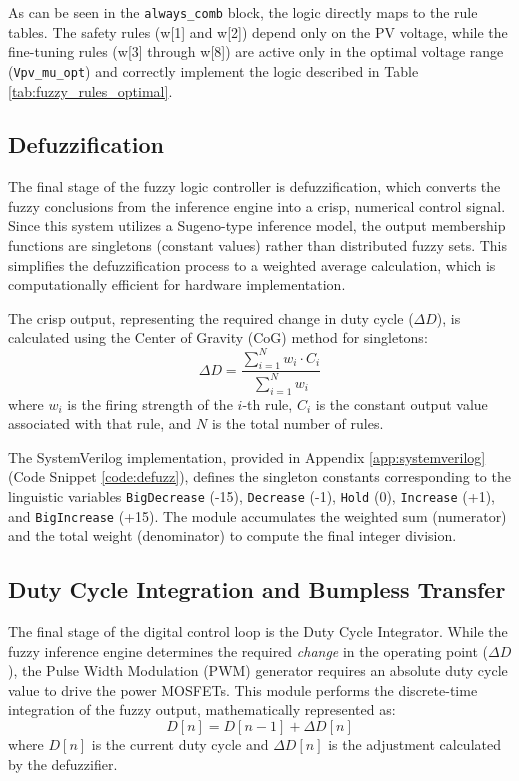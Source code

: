 \documentclass[a4paper,oneside,12pt]{report}
\numberwithin{equation}{chapter}
\begin{document}
As can be seen in the \texttt{always\_comb} block, the logic directly maps to the rule tables. The safety rules (w[1] and w[2]) depend only on the PV voltage, while the fine-tuning rules (w[3] through w[8]) are active only in the optimal voltage range (\texttt{Vpv\_mu\_opt}) and correctly implement the logic described in Table \ref{tab:fuzzy_rules_optimal}.

\subsection{Defuzzification}
\label{sec:sv_defuzzification}
The final stage of the fuzzy logic controller is defuzzification, which converts the fuzzy conclusions from the inference engine into a crisp, numerical control signal. Since this system utilizes a Sugeno-type inference model, the output membership functions are singletons (constant values) rather than distributed fuzzy sets. This simplifies the defuzzification process to a weighted average calculation, which is computationally efficient for hardware implementation.

The crisp output, representing the required change in duty cycle ($\Delta D$), is calculated using the Center of Gravity (CoG) method for singletons:
\begin{equation}
    \Delta D = \frac{\sum_{i=1}^{N} w_i \cdot C_i}{\sum_{i=1}^{N} w_i}
\end{equation}
where $w_i$ is the firing strength of the $i$-th rule, $C_i$ is the constant output value associated with that rule, and $N$ is the total number of rules.

The SystemVerilog implementation, provided in Appendix \ref{app:systemverilog} (Code Snippet \ref{code:defuzz}), defines the singleton constants corresponding to the linguistic variables \texttt{Big\textunderscore Decrease} (-15), \texttt{Decrease} (-1), \texttt{Hold} (0), \texttt{Increase} (+1), and \texttt{Big\textunderscore Increase} (+15). The module accumulates the weighted sum (numerator) and the total weight (denominator) to compute the final integer division.
\subsection{Duty Cycle Integration and Bumpless Transfer}
\label{sec:sv_duty_integrator}
The final stage of the digital control loop is the Duty Cycle Integrator. While the fuzzy inference engine determines the required \textit{change} in the operating point ($\Delta D$), the Pulse Width Modulation (PWM) generator requires an absolute duty cycle value to drive the power MOSFETs. This module performs the discrete-time integration of the fuzzy output, mathematically represented as:
\begin{equation}
    D[n] = D[n-1] + \Delta D[n]
\end{equation}
where $D[n]$ is the current duty cycle and $\Delta D[n]$ is the adjustment calculated by the defuzzifier.
\end{document}
